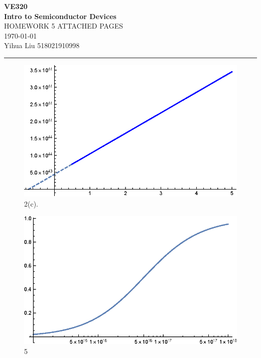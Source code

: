 \documentclass[a4paper]{article}
\begin{document}
\begin{center}
\huge
\textbf{VE320\\Intro to Semiconductor Devices\\}
\Large
\vspace{30pt}
\uppercase{Homework 5 Attached Pages}\\
\vspace{5pt}\today\\
\vspace{5pt}
Yihua Liu 518021910998
\vspace{5pt}
\rule[-10pt]{.97\linewidth}{0.05em}
\end{center}
\begin{figure}[H]
    \centering
    \includegraphics[width=1\textwidth]{1.eps}
    \caption{2(c).}
\end{figure}
\begin{figure}[H]
    \centering
    \includegraphics[width=1\textwidth]{2.eps}
    \caption{5}
\end{figure}
\end{document}
